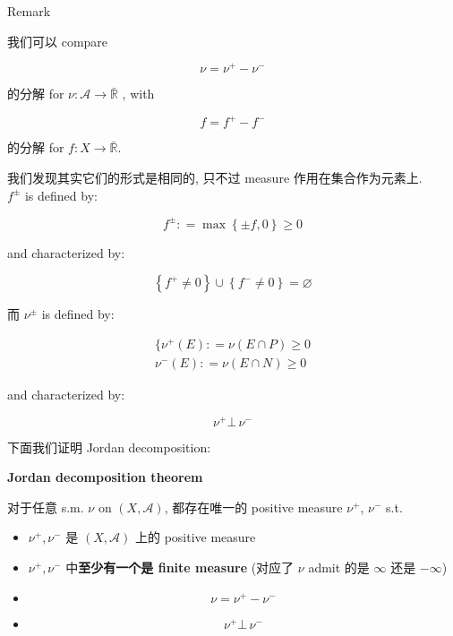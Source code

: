 \documentclass{qlnotes-export}
\begin{document}
\begin{qlremark}{Remark}

我们可以 compare

\[\nu = \nu^{+} - \nu^{-}\]

的分解 for \(\nu:\mathcal{A}\rightarrow\bar{\mathbb{R}}\) , with

\[f = f^{+} - f^{-}\]

的分解 for \(f:X\rightarrow\bar{\mathbb{R}}\).

我们发现其实它们的形式是相同的, 只不过 measure 作用在集合作为元素上.\\
\(f^{\pm}\) is defined by:

\[f^{\pm}: = \max\left\{ {\pm f,0} \right\} \geq 0\]

and characterized by:

\[\left\{ {f^{+} \neq 0} \right\} \cup \left\{ {f^{-} \neq 0} \right\} = \varnothing\]

而 \(\nu^{\pm}\) is defined by:

\[\begin{matrix}
{\{\nu^{+}(E): = \nu(E \cap P) \geq 0} \\
{\nu^{-}(E): = \nu(E \cap N) \geq 0}
\end{matrix}\]

and characterized by:

\[\nu^{+}\bot\,\nu^{-}\]

\end{qlremark}

下面我们证明 Jordan decomposition:

\begin{theorem}{\protect{}\label{kn-jordan-decomposition-theorem}{\textbf{Jordan
decomposition theorem}}}

对于任意 s.m. \(\nu\) on \((X,\mathcal{A})\), 都存在唯一的 positive measure \(\nu^{+}\), \(\nu^{-}\) s.t.

\begin{itemize}
\item
  \(\nu^{+},\nu^{-}\) 是 \((X,\mathcal{A})\) 上的 positive measure
\item
  \(\nu^{+},\nu^{-}\) 中\textbf{至少有一个是 finite measure} (对应了 \(\nu\) admit 的是 \(\infty\) 还是 \(- \infty\))
\item
  \[\nu = \nu^{+} - \nu^{-}\]
\item
  \[\nu^{+}\bot\,\nu^{-}\]
\end{itemize}

\end{theorem}
\end{document}

